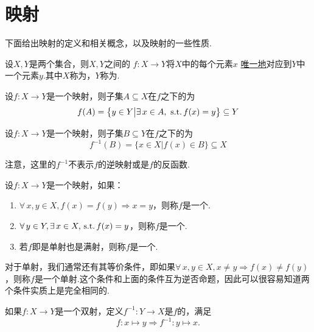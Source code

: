 \section{映射}

下面给出映射的定义和相关概念，以及映射的一些性质.

\begin{definition}[映射][def:1.3]
    设$X,Y$是两个集合，则$X,Y$之间的 $f:X\to Y$将$X$中的每个元素$x$ \uline{唯一地}对应到$Y$中一个元素$y$.其中$X$称为，$Y$称为.
\end{definition}

\begin{definition}[映射的像][def:1.4]
    设$f:X\to Y$是一个映射，则子集$A\subseteq X$在$f$之下的为
    \[f(A)=\big\{y\in Y\big|\exists\, x\in A,\,\operatorname{\,\text{s.t.}} f(x)=y \big\}\subseteq Y\]
\end{definition}

\begin{definition}[原像][def:1.5]
    设$f:X\to Y$是一个映射，则子集$B\subseteq Y$在$f$之下的为
    \[f^{-1}(B)=\big\{x\in X\big|f(x)\in B \big\}\subseteq X\]
\end{definition}

\begin{attention}
    注意，这里的$f^{-1}$不表示$f$的逆映射或是$f$的反函数.
\end{attention}

\begin{definition}[单射,满射,双射][def:1.6]
    设$f:X\to Y$是一个映射，如果：
    \begin{enumerate}
        \item $\forall\, x,y\in X,f(x)=f(y)\Rightarrow x=y$，则称$f$是一个.
        \item $\forall\,y\in Y,\exists\, x\in X,\operatorname{\,\text{s.t.}} f(x)=y$，则称$f$是一个.
        \item 若$f$即是单射也是满射，则称$f$是一个.
    \end{enumerate}
\end{definition}
对于单射，我们通常还有其等价条件，即如果$\forall\, x,y\in X,x\neq y\Rightarrow f(x)\neq f(y)$，则称$f$是一个单射.这个条件和上面的条件互为逆否命题，因此可以很容易知道两个条件实质上是完全相同的.





\begin{definition}[逆映射][def:1.7]
    如果$f:X\to Y$是一个双射，定义$f^{-1}:Y\to X$是$f$的，满足
    \begin{equation*}
    f:x\mapsto y \Rightarrow f^{-1}:y\mapsto x.
    \end{equation*}
\end{definition}

